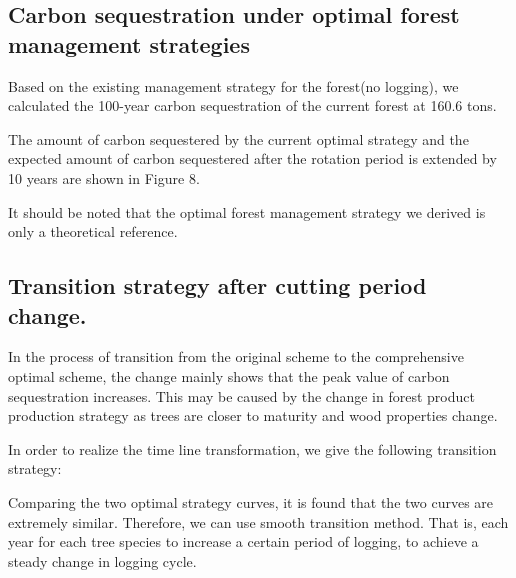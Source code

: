 \subsection{Carbon sequestration under optimal forest management strategies}

Based on the existing management strategy for the forest(no logging), we calculated the 100-year carbon sequestration of the current forest at 160.6 tons.

The amount of carbon sequestered by the current optimal strategy and the expected amount of carbon sequestered after the rotation period is extended by 10 years are shown in Figure 8. 

It should be noted that the optimal forest management strategy we derived is only a theoretical reference.

\subsection{Transition strategy after cutting period change.}

In the process of transition from the original scheme to the comprehensive optimal scheme, the change mainly shows that the peak value of carbon sequestration increases. This may be caused by the change in forest product production strategy as trees are closer to maturity and wood properties change.

In order to realize the time line transformation, we give the following transition strategy:

Comparing the two optimal strategy curves, it is found that the two curves are extremely similar. Therefore, we can use smooth transition method. That is, each year for each tree species to increase a certain period of logging, to achieve a steady change in logging cycle.


